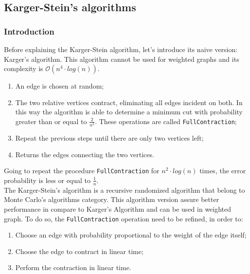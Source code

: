 \subsection{Karger-Stein's algorithms}

\subsubsection{Introduction}
Before explaining the Karger-Stein algorithm, let's introduce its naive version: Karger's algorithm.
This algorithm cannot be used for weighted graphs and its complexity is  $\mathcal{O}(n^4 \cdot log(n))$.
\begin{enumerate}
    \item An edge is chosen at random;
    \item The two relative vertices contract, eliminating all edges incident on both. In this way the algorithm is able to determine a minimum cut with probability greater than or equal to $\frac{2}{n^2}$. These operations are called \verb|FullContraction|;
    \item Repeat the previous steps until there are only two vertices left;
    \item Returns the edges connecting the two vertices.
\end{enumerate}
Going to repeat the procedure \verb|FullContraction| for $n^2 \cdot log(n)$ times, the error probability is less or equal to $\frac{1}{n}$.\\
\noindent
The Karger-Stein's algorithm is a recursive randomized algorithm that belong to Monte Carlo's algorithms category. This algorithm version assure better performance in compare to Karger's Algorithm and can be used in weighted graph.
To do so, the \verb|FullContraction| operation need to be refined, in order to:
\begin{enumerate}
    \item Choose an edge with probability proportional to the weight of the edge itself;
    \item Choose the edge to contract in linear time;
    \item Perform the contraction in linear time.
\end{enumerate}

